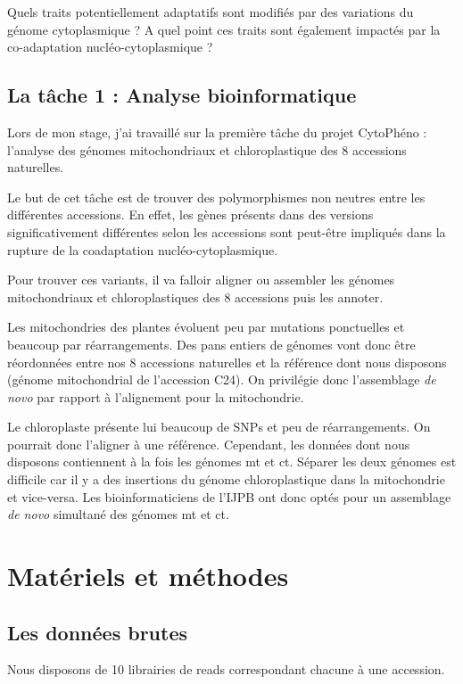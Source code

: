 \documentclass[a4paper]{article}
\begin{document}
Quels traits potentiellement adaptatifs sont modifiés par des variations du génome cytoplasmique ? A quel point ces traits sont également impactés par la co-adaptation nucléo-cytoplasmique ?  

\subsection{La tâche 1 : Analyse bioinformatique}

Lors de mon stage, j'ai travaillé sur la première tâche du projet CytoPhéno : l'analyse des génomes mitochondriaux et chloroplastique des 8 accessions naturelles.

Le but de cet tâche est de trouver des polymorphismes non neutres entre les différentes accessions. En effet, les gènes présents dans des versions significativement différentes selon les accessions sont peut-être impliqués dans la rupture de la coadaptation nucléo-cytoplasmique. 

Pour trouver ces variants, il va falloir aligner ou assembler les génomes mitochondriaux et chloroplastiques des 8 accessions puis les annoter. 

Les mitochondries des plantes évoluent peu par mutations ponctuelles et beaucoup par réarrangements. Des pans entiers de génomes vont donc être réordonnées entre nos 8 accessions naturelles et la référence dont nous disposons (génome mitochondrial de l'accession C24). On privilégie donc l'assemblage \textit{de novo} par rapport à l'alignement pour la mitochondrie.

Le chloroplaste présente lui beaucoup de SNPs et peu de réarrangements. On pourrait donc l'aligner à une référence. Cependant, les données dont nous disposons contiennent à la fois les génomes mt et ct. Séparer les deux génomes est difficile car il y a des insertions du génome chloroplastique dans la mitochondrie et vice-versa. Les bioinformaticiens de l'IJPB ont donc optés pour un assemblage \textit{de novo} simultané des génomes mt et ct.


\section{Matériels et méthodes}

\subsection{Les données brutes}

Nous disposons de 10 librairies de reads correspondant chacune à une accession. 
\end{document}
